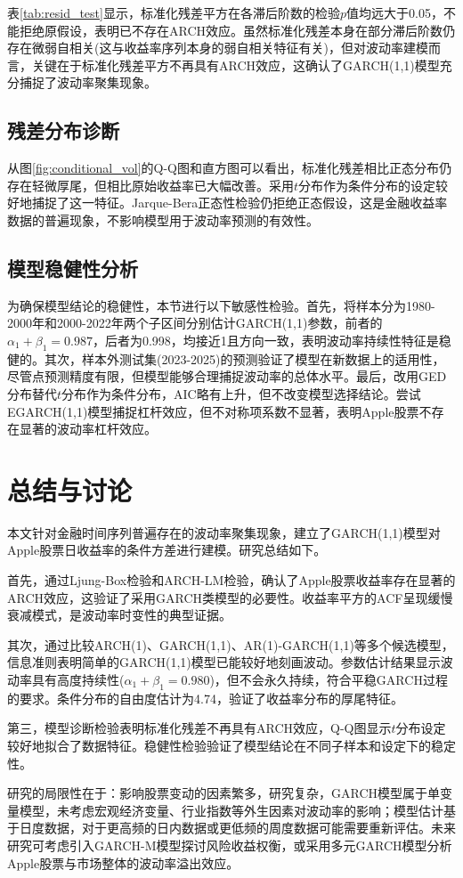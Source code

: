 \documentclass[10pt, a4paper]{ctexart}
\theoremstyle{definition}
\numberwithin{equation}{section}
\numberwithin{figure}{section}
\numberwithin{table}{section}
\begin{document}
表\ref{tab:resid_test}显示，标准化残差平方在各滞后阶数的检验\(p\)值均远大于0.05，不能拒绝原假设，表明已不存在ARCH效应。虽然标准化残差本身在部分滞后阶数仍存在微弱自相关(这与收益率序列本身的弱自相关特征有关)，但对波动率建模而言，关键在于标准化残差平方不再具有ARCH效应，这确认了GARCH(1,1)模型充分捕捉了波动率聚集现象。

\subsection{残差分布诊断}

从图\ref{fig:conditional_vol}的Q-Q图和直方图可以看出，标准化残差相比正态分布仍存在轻微厚尾，但相比原始收益率已大幅改善。采用\(t\)分布作为条件分布的设定较好地捕捉了这一特征。Jarque-Bera正态性检验仍拒绝正态假设，这是金融收益率数据的普遍现象，不影响模型用于波动率预测的有效性。

\subsection{模型稳健性分析}

为确保模型结论的稳健性，本节进行以下敏感性检验。首先，将样本分为1980-2000年和2000-2022年两个子区间分别估计GARCH(1,1)参数，前者的\(\alpha_1 + \beta_1 = 0.987\)，后者为0.998，均接近1且方向一致，表明波动率持续性特征是稳健的。其次，样本外测试集(2023-2025)的预测验证了模型在新数据上的适用性，尽管点预测精度有限，但模型能够合理捕捉波动率的总体水平。最后，改用GED分布替代\(t\)分布作为条件分布，AIC略有上升，但不改变模型选择结论。尝试EGARCH(1,1)模型捕捉杠杆效应，但不对称项系数不显著，表明Apple股票不存在显著的波动率杠杆效应。


\section{总结与讨论}

本文针对金融时间序列普遍存在的波动率聚集现象，建立了GARCH(1,1)模型对Apple股票日收益率的条件方差进行建模。研究总结如下。

首先，通过Ljung-Box检验和ARCH-LM检验，确认了Apple股票收益率存在显著的ARCH效应，这验证了采用GARCH类模型的必要性。收益率平方的ACF呈现缓慢衰减模式，是波动率时变性的典型证据。

其次，通过比较ARCH(1)、GARCH(1,1)、AR(1)-GARCH(1,1)等多个候选模型，信息准则表明简单的GARCH(1,1)模型已能较好地刻画波动。参数估计结果显示波动率具有高度持续性(\(\alpha_1 + \beta_1 = 0.980\))，但不会永久持续，符合平稳GARCH过程的要求。条件分布的自由度估计为4.74，验证了收益率分布的厚尾特征。

第三，模型诊断检验表明标准化残差不再具有ARCH效应，Q-Q图显示\(t\)分布设定较好地拟合了数据特征。稳健性检验验证了模型结论在不同子样本和设定下的稳定性。

研究的局限性在于：影响股票变动的因素繁多，研究复杂，GARCH模型属于单变量模型，未考虑宏观经济变量、行业指数等外生因素对波动率的影响；模型估计基于日度数据，对于更高频的日内数据或更低频的周度数据可能需要重新评估。未来研究可考虑引入GARCH-M模型探讨风险收益权衡，或采用多元GARCH模型分析Apple股票与市场整体的波动率溢出效应。
\end{document}
